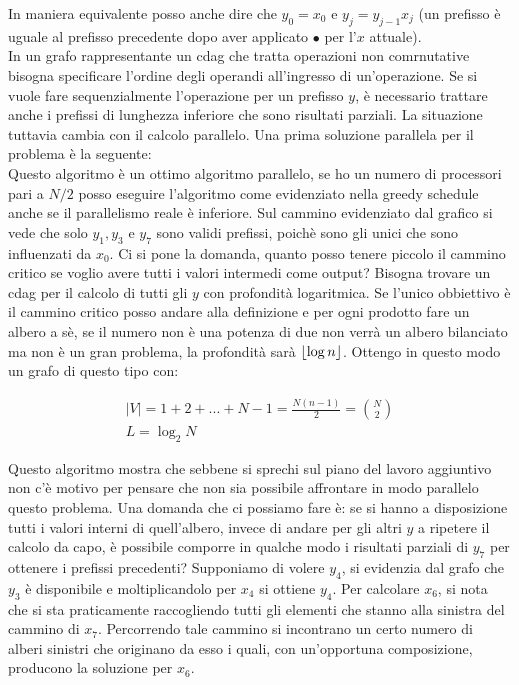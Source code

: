 \documentclass[a4paper,portrait,12pt]{article}
\theoremstyle{definition}
\providecommand{\abs}[1]{\lvert#1\rvert}
\DeclarePairedDelimiter{\floor}{\lfloor}{\rfloor}
\begin{document}
In maniera equivalente posso anche dire che $y_0 = x_0$ e $y_j = y_{j-1}x_j$ (un prefisso è uguale al prefisso precedente dopo aver applicato $\bullet$ per l'$x$ attuale).\\

In un grafo rappresentante un cdag che tratta operazioni non comrnutative bisogna specificare l’ordine degli operandi all’ingresso di un’operazione.
Se si vuole fare sequenzialmente l’operazione per un prefisso $y$, è necessario trattare anche i prefissi di lunghezza inferiore che sono risultati parziali.
La situazione tuttavia cambia con il calcolo parallelo.
Una prima soluzione parallela per il problema è la seguente:\\

Questo algoritmo è un ottimo algoritmo parallelo, se ho un numero di processori pari a $N/2$ posso eseguire l’algoritmo come evidenziato nella greedy schedule anche se il parallelismo reale è inferiore.
Sul cammino evidenziato dal grafico si vede che solo $y_1,y_3$ e $y_7$ sono validi prefissi, poichè sono gli unici che sono influenzati da $x_0$.
Ci si pone la domanda, quanto posso tenere piccolo il cammino critico se voglio avere tutti i valori
intermedi come output?
Bisogna trovare un cdag per il calcolo di tutti gli $y$ con profondità logaritmica.
Se l’unico obbiettivo è il cammino critico posso andare alla definizione e per ogni prodotto fare un albero a sè, se il numero non è una potenza di due non verrà un albero bilanciato ma non è un gran problema, la profondità sarà $\floor{\log n}$.
Ottengo in questo modo un grafo di questo tipo con:

\begin{gather*}
\abs{V} = 1 + 2 + ... + N-1 = \frac{N(n-1)}{2} = \binom{N}{2}\\
L = \log_2 N
\end{gather*}

Questo algoritmo mostra che sebbene si sprechi sul piano del lavoro aggiuntivo non c’è motivo per pensare che non sia possibile affrontare in modo parallelo questo problema.
Una domanda che ci possiamo fare è: se si hanno a disposizione tutti i valori interni di quell’albero, invece di andare per gli altri $y$ a ripetere il calcolo da capo, è possibile comporre in qualche modo i risultati parziali di $y_7$ per ottenere i prefissi precedenti?
Supponiamo di volere $y_4$, si evidenzia dal grafo che $y_3$ è disponibile e moltiplicandolo per $x_4$ si ottiene $y_4$.
Per calcolare $x_6$, si nota che si sta praticamente raccogliendo tutti gli elementi che stanno alla sinistra del cammino di $x_7$.
Percorrendo tale cammino si incontrano un certo numero di alberi sinistri che originano da esso i quali, con un’opportuna composizione, producono la soluzione per $x_6$.
\end{document}
